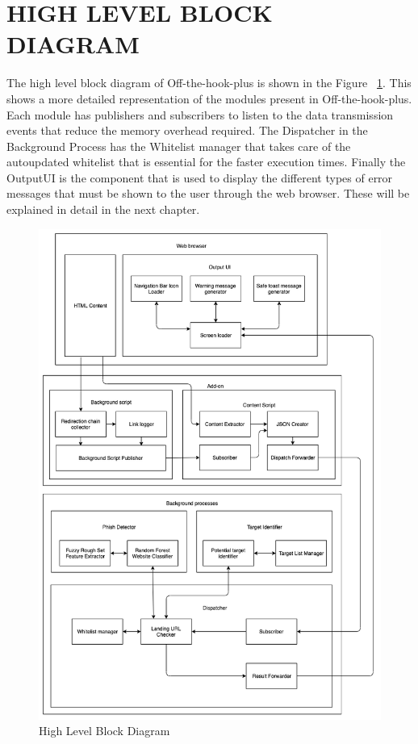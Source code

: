 \section{HIGH LEVEL BLOCK DIAGRAM}

The high level block diagram of Off-the-hook-plus is shown in the Figure ~\ref{fig:block}. 
This shows a more detailed representation of the modules present in Off-the-hook-plus. Each module has publishers and subscribers to listen to the data transmission events that reduce the memory overhead required. The Dispatcher in the Background Process has the Whitelist manager that takes care of the autoupdated whitelist that is essential for the faster execution times. Finally the OutputUI is the component that is used to display the different types of error messages that must be shown to the user through the web browser. These will be explained in detail in the next chapter.

\newpage

\begin{figure}[h!]
\centering
\includegraphics[scale=0.5]{Figures/image3.png}
\caption{High Level Block Diagram}
\label{fig:block}
\end{figure}

